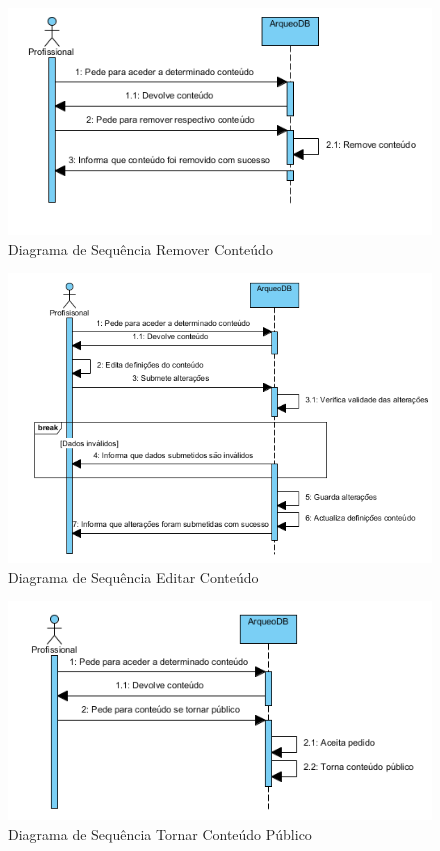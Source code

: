 ﻿\documentclass[12pt,a4paper]{article}
\begin{document}
\begin{figure}[h!]
\centering
\includegraphics[scale=0.8]{sequencia/removerconteudo}
\caption{Diagrama de Sequência Remover Conteúdo} 
\end{figure} 

\begin{figure}[h!]
\centering
\includegraphics[scale=0.8]{sequencia/editarconteudo}
\caption{Diagrama de Sequência Editar Conteúdo} 
\end{figure}


 
\begin{figure}[h!]
\centering
\includegraphics[scale=1]{sequencia/tornarpublico}
\caption{Diagrama de Sequência Tornar Conteúdo Público} 
\end{figure}  
\end{document}
